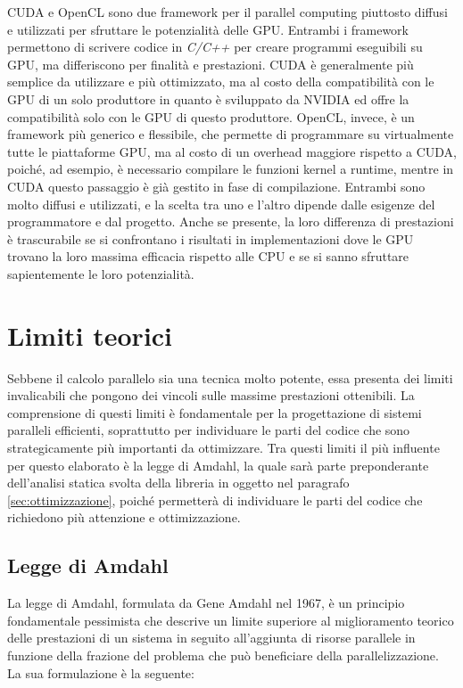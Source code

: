 CUDA e OpenCL sono due framework per il parallel computing piuttosto diffusi e utilizzati
per sfruttare le potenzialità delle GPU. Entrambi i framework permettono di
scrivere codice in \textit{C/C++} per creare programmi eseguibili su GPU, ma
differiscono per finalità e prestazioni. CUDA è generalmente più semplice da utilizzare
e più ottimizzato, ma al costo della compatibilità con le GPU di un solo
produttore in quanto è sviluppato da NVIDIA ed offre la compatibilità solo con
le GPU di questo produttore. OpenCL, invece, è un framework più generico e flessibile,
che permette di programmare su virtualmente tutte le piattaforme GPU, ma al costo
di un overhead maggiore rispetto a CUDA, poiché, ad esempio, è necessario
compilare le funzioni kernel a runtime, mentre in CUDA questo passaggio è già gestito
in fase di compilazione. Entrambi sono molto diffusi e utilizzati, e la scelta tra
uno e l'altro dipende dalle esigenze del programmatore e dal progetto. Anche se
presente, la loro differenza di prestazioni è trascurabile se si confrontano i risultati
in implementazioni dove le GPU trovano la loro massima efficacia rispetto alle CPU
e se si sanno sfruttare sapientemente le loro potenzialità.

\section{Limiti teorici}
\label{sec:limititeorici}

Sebbene il calcolo parallelo sia una tecnica molto potente, essa presenta dei limiti
invalicabili che pongono dei vincoli sulle massime prestazioni ottenibili. La
comprensione di questi limiti è fondamentale per la progettazione di sistemi
paralleli efficienti, soprattutto per individuare le parti del codice che sono strategicamente
più importanti da ottimizzare. Tra questi limiti il più influente per questo
elaborato è la legge di Amdahl, la quale sarà parte preponderante dell'analisi statica
svolta della libreria in oggetto nel paragrafo \ref{sec:ottimizzazione}, poiché
permetterà di individuare le parti del codice che richiedono più attenzione e
ottimizzazione.

\subsection{Legge di Amdahl}
\label{sec:amdahl}

La legge di Amdahl, formulata da Gene Amdahl nel 1967, è un principio fondamentale
pessimista che descrive un limite superiore al miglioramento teorico delle prestazioni
di un sistema in seguito all'aggiunta di risorse parallele in funzione della frazione
del problema che può beneficiare della parallelizzazione. La sua formulazione è
la seguente:

